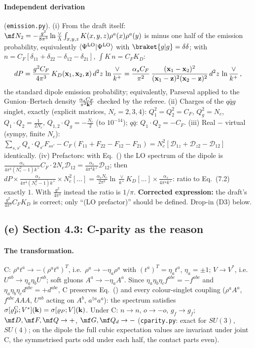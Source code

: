 \paragraph{Independent derivation} (\texttt{emission.py}). (i) From the draft itself: $\mf N_2=-\frac{g^2}{8\pi^3}\ln\frac\vee\Lambda\int_{x,y,z}K(x,y,z)\rho^a(x)\rho^a(y)$ is minus one half of the emission probability, equivalently $\langle\Psi^{\rm LO}|\Psi^{\rm LO}\rangle$ with $\braket{g|g}=\delta\delta$; with $n=C_F[\delta_{11}+\delta_{22}-\delta_{12}-\delta_{21}]$, $\int K\,n=C_FK_D$:
\begin{align}\label{r3c:P}
dP=\frac{g^2C_F}{4\pi^3}\,K_D(\mathbf{x}_1,\mathbf{x}_2,\mathbf{z})\,d^2z\,\ln\frac{\vee}{k^+}=\frac{\alpha_sC_F}{\pi^2}\,\frac{(\mathbf{x}_1-\mathbf{x}_2)^2}{(\mathbf{x}_1-\mathbf{z})^2(\mathbf{x}_2-\mathbf{z})^2}\,d^2z\,\ln\frac{\vee}{k^+}\,,
\end{align}
the standard dipole emission probability; equivalently, Parseval applied to the Gunion--Bertsch density $\frac{\alpha_sC_F}{\pi^2\mathbf{k}^2}$ checked by the referee. (ii) Charges of the $q\bar qg$ singlet, exactly (explicit matrices, $N_c=2,3,4$): $Q_1^2=Q_2^2=C_F$, $Q_g^2=N_c$, $Q_1\!\cdot\!Q_2=\frac1{2N_c}$, $Q_{1,2}\!\cdot\!Q_g=-\frac{N_c}{2}$ (to $10^{-14}$); $q\bar q$: $Q_1\!\cdot\!Q_2=-C_F$. (iii) Real $-$ virtual (sympy, finite $N_c$): $\sum_{s,s'}Q_s\!\cdot\!Q_{s'}F_{ss'}-C_F(F_{11}+F_{22}-F_{12}-F_{21})=N_c^2[\mathcal D_{1z}+\mathcal D_{z2}-\mathcal D_{12}]$ identically. (iv) Prefactors: with Eq.~() the LO spectrum of the dipole is $\frac{\alpha_s}{4\pi^4(N_c^2-1)k^+}C_F\cdot2N_c\mathcal D_{12}=\frac{\alpha_s}{4\pi^4k^+}\mathcal D_{12}$; then $dP\times\frac{\alpha_s}{4\pi^4(N_c^2-1)k^+}\times N_c^2[\dots]=\frac{\alpha_sN_c}{2\pi^2}\ln\frac\vee{k^+}K_D[\dots]\times\frac{\alpha_s}{4\pi^4k^+}$: ratio to Eq.~(7.2) exactly $1$. With $\frac{g^2}{4\pi^4}$ instead the ratio is $1/\pi$. \textbf{Corrected expression:} the draft's $\frac{g^2}{4\pi^3}C_FK_D$ is correct; only ``(LO prefactor)'' should be defined. Drop-in (D3) below.

\subsection{(e) Section 4.3: C-parity as the reason}\label{r3c:e}
\paragraph{The transformation.} $\mathrm C$: $\rho^at^a\to-(\rho^at^a)^T$, i.e.\ $\rho^a\to-\eta_a\rho^a$ with $(t^a)^T=\eta_at^a$, $\eta_a=\pm1$; $V\to V^*$, i.e.\ $U^{ab}\to\eta_a\eta_bU^{ab}$; soft gluons $A^a\to-\eta_aA^a$. Since $\eta_a\eta_b\eta_cf^{abc}=-f^{abc}$ and $\eta_a\eta_b\eta_cd^{abc}=+d^{abc}$, C preserves Eq.~() and every colour-singlet coupling ($\rho^aA^a$, $f^{abc}AAA$, $U^{ab}$ acting on $A^b$, $a^{\dagger a}a^a$): the spectrum satisfies $\sigma[\varrho_P^{\rm C};V^*](\mathbf{k})=\sigma[\varrho_P;V](\mathbf{k})$. Under C: $n\to n$, $o\to-o$, $g_f\to g_f$; $\mf D,\mf F,\mf Q\to+$, $\mf G,\mf Q_d\to-$ (\texttt{cparity.py}: exact for $SU(3)$, $SU(4)$; on the dipole the full cubic expectation values are invariant under joint C, the symmetrised parts odd under each half, the contact parts even).

